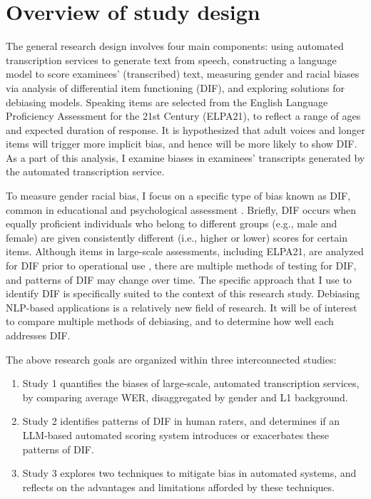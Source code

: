 \documentclass [PhD] {uclathes}
\begin{document}
\section{Overview of study design}

The general research design involves four main components: using automated transcription services to generate text from speech, constructing a language model to score examinees’ (transcribed) text, measuring gender and racial biases via analysis of differential item functioning (DIF), and exploring solutions for debiasing models. Speaking items are selected from the English Language Proficiency Assessment for the 21st Century (ELPA21), to reflect a range of ages and expected duration of response. It is hypothesized that adult voices and longer items will trigger more implicit bias, and hence will be more likely to show DIF. As a part of this analysis, I examine biases in examinees’ transcripts generated by the automated transcription service. 

To measure gender racial bias, I focus on a specific type of bias known as DIF, common in educational and psychological assessment \citep{aera2014}. Briefly, DIF occurs when equally proficient individuals who belong to different groups (e.g., male and female) are given consistently different (i.e., higher or lower) scores for certain items. Although items in large-scale assessments, including ELPA21, are analyzed for DIF prior to operational use \citep{anderson2015elpa21}, there are multiple methods of testing for DIF, and patterns of DIF may change over time. The specific approach that I use to identify DIF is specifically suited to the context of this research study. Debiasing NLP-based applications is a relatively new field of research. It will be of interest to compare multiple methods of debiasing, and to determine how well each addresses DIF.

The above research goals are organized within three interconnected studies: 

\begin{enumerate}
    \item Study 1 quantifies the biases of large-scale, automated transcription services, by comparing average WER, disaggregated by gender and L1 background.
    \item Study 2 identifies patterns of DIF in human raters, and determines if an LLM-based automated scoring system introduces or exacerbates these patterns of DIF. 
    \item Study 3 explores two techniques to mitigate bias in automated systems, and reflects on the advantages and limitations afforded by these techniques.
\end{enumerate}
\end{document}

